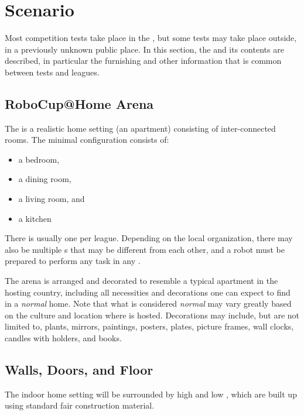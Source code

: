 \section{Scenario}\label{sec:scenario}

Most competition tests take place in the \RoboCup\AtHome\Arena, but some tests may take place outside, in a previously unknown public place.
In this section, the \Arena{} and its contents are described, in particular the furnishing and other information that is common between tests and leagues.

\subsection{RoboCup@Home Arena}

The \RoboCup\AtHome\Arena{} is a realistic home setting (an apartment) consisting of inter-connected rooms.
The minimal configuration consists of:
\begin{itemize}
	\item a bedroom,
	\item a dining room,
	\item a living room, and
	\item a kitchen
\end{itemize}
There is usually one \Arena{} per league.
Depending on the local organization, there may also be multiple \Arena{}s that may be different from each other, and a robot must be prepared to perform any task in any \Arena{}.

The arena is arranged and decorated to resemble a typical apartment in the hosting country, including all necessities and decorations one can expect to find in a \emph{normal} home.
Note that what is considered \emph{normal} may vary greatly based on the culture and location where \RoboCup{} is hosted.
Decorations may include, but are not limited to, plants, mirrors, paintings, posters, plates, picture frames, wall clocks, candles with holders, and books.

\subsection{Walls, Doors, and Floor}\label{rule:scenario_walls}

The indoor home setting will be surrounded by high and low , which are built up using standard fair construction material.

